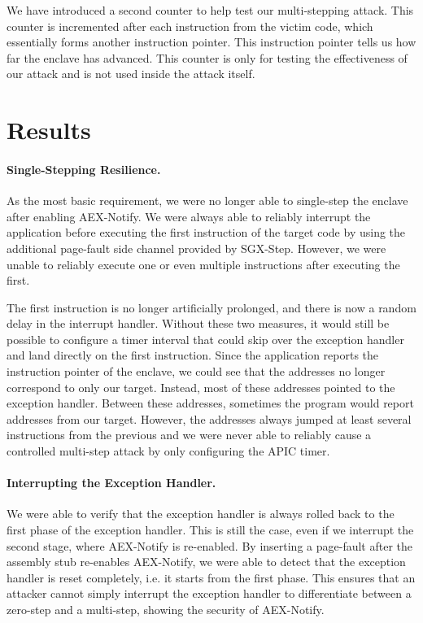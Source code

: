 \documentclass{llncs}
\begin{document}
We have introduced a second counter to help test our multi-stepping attack.
This counter is incremented after each instruction from the victim code,
which essentially forms another instruction pointer.
This instruction pointer tells us how far the enclave has advanced.
This counter is only for testing the effectiveness of our attack
and is not used inside the attack itself.

\section{Results}

\paragraph{Single-Stepping Resilience.}
As the most basic requirement,
we were no longer able to single-step the enclave after enabling AEX-Notify.
We were always able to reliably interrupt the application
before executing the first instruction of the target code
by using the additional page-fault side channel provided by SGX-Step.
However, we were unable to reliably execute one or
even multiple instructions after executing the first.

The first instruction is no longer artificially prolonged, and there is now a random delay in the interrupt handler. Without these two measures, it would still be possible to configure a timer interval that could skip over the exception handler and land directly on the first instruction.
Since the application reports the instruction pointer of the enclave,
we could see that the addresses no longer correspond to only our target.
Instead, most of these addresses pointed to the exception handler.
Between these addresses, sometimes the program would report addresses from our target.
However, the addresses always jumped at least several instructions from the previous
and we were never able to reliably cause a controlled multi-step attack
by only configuring the APIC timer.

\paragraph{Interrupting the Exception Handler.}
We were able to verify that the exception handler is always rolled back to the first phase of the exception handler.
This is still the case, even if we interrupt the second stage, where AEX-Notify is re-enabled.
By inserting a page-fault after the assembly stub re-enables AEX-Notify,
we were able to detect that the exception handler is reset completely,
i.e. it starts from the first phase.
This ensures that an attacker cannot simply interrupt the exception handler
to differentiate between a zero-step and a multi-step,
showing the security of AEX-Notify.
\end{document}
